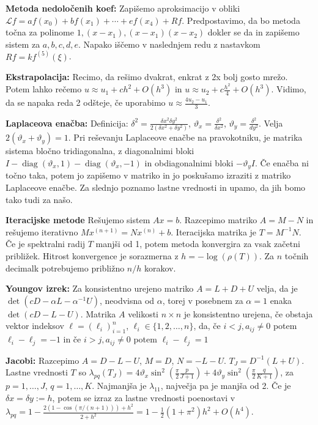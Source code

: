 \documentclass[a4paper,12pt]{article}
\theoremstyle{definition}
\renewcommand{\theta}{\vartheta}
\renewcommand{\L}{\mathcal{L}}
\newcommand{\dx}{\delta x}
\newcommand{\dy}{\delta y}
\newcommand{\diag}{\operatorname{diag}}
\begin{document}
\textbf{Metoda nedoločenih koef:}
Zapišemo aproksimacijo v obliki $\L f = af(x_0) + bf(x_1) + \cdots + ef(x_4) + Rf$. Predpostavimo, da bo metoda točna za polinome $1, (x-x_1), (x-x_1)(x-x_2)$ dokler se da in
zapišemo sistem za $a, b, c, d, e$. Napako iščemo v naslednjem redu z nastavkom $Rf = k f^{(5)}(\xi)$.

\textbf{Ekstrapolacija:}
Recimo, da rešimo dvakrat, enkrat z 2x bolj gosto mrežo. Potem lahko rečemo $u \approx u_1 + ch^2 + O(h^3)$ in $u \approx u_2 + c \frac{h^2}{4} + O(h^3)$. Vidimo, da se napaka reda 2 odšteje, če uporabimo $u \approx \frac{4u_2 - u_1}{3}$.

\textbf{Laplaceova enačba:}
Definicija: $\delta^2 = \frac{\dx^2\dy^2}{2(\dx^2+\dy^2)}$, $\theta_x = \frac{\delta^2}{\dx^2}$, $\theta_y = \frac{\delta^2}{dy^2}$. Velja $2(\theta_x + \theta_y) = 1$.
Pri reševanju Laplaceove enačbe na pravokotniku, je matrika sistema bločno tridiagonalna, z diagonalnimi bloki
$I - \diag(\theta_x, 1) - \diag(\theta_x, -1)$ in
obdiagonalnimi bloki $-\theta_y I$.
Če enačba ni točno taka, potem jo zapišemo v matriko in jo poskušamo
izraziti z matriko Laplaceove enačbe. Za slednjo poznamo lastne vrednosti
in upamo, da jih bomo tako tudi za našo.

\textbf{Iteracijske metode}
Rešujemo sistem $Ax =b$. Razcepimo matriko $A = M-N$ in rešujemo iterativno
$Mx^{(n+1)} = Nx^{(n)} + b$. Iteracijska matrika je $T = M^{-1}N$.
Če je spektralni radij $T$ manjši od 1, potem metoda konvergira za vsak začetni približek. Hitrost konvergence je sorazmerna z $h = -\log(\rho(T))$. Za $n$ točnih decimalk potrebujemo približno $n / h$ korakov.

\textbf{Youngov izrek:} Za konsistentno urejeno matriko $A = L + D + U$ velja,
da je $\det(cD - \alpha L - \alpha^{-1}U)$, neodvisna od $\alpha$, torej v
posebnem za $\alpha = 1$ enaka $\det(cD - L - U)$. Matrika $A$ velikosti $n\times n$
je konsistentno urejena, če obstaja vektor indeksov $\ell = (\ell_i)_{i=1}^n$,
$\ell_i \in \{1, 2, \ldots, n\}$, da, če $i < j, a_{ij} \neq 0$ potem $\ell_i - \ell_j = -1$ in če $i > j, a_{ij} \neq 0$ potem $\ell_i - \ell_j = 1$

\textbf{Jacobi:}
Razcepimo $A = D - L - U$, $M = D$, $N = -L-U$. $T_J = D^{-1}(L+U)$.
Lastne vrednosti $T$ so
$\lambda_{pq}(T_J) = 4\theta_x \sin^2\left(\frac{\pi}{2} \frac{p}{J+1}\right) +
4\theta_y \sin^2\left(\frac{\pi}{2} \frac{q}{K+1}\right)$, za $p = 1, \ldots, J$, $q = 1, \ldots, K$. Najmanjša je $\lambda_{11}$, največja pa je manjša od 2.
Če je $\dx = \dy := h$, potem se izraz za lastne vrednosti poenostavi v
$\lambda_{pq} = 1 - \frac{2(1-\cos(\pi / (n+1))) + h^2}{2+h^2} =
1 - \frac12 (1+\pi^2)h^2 + O(h^4)$.
\end{document}

